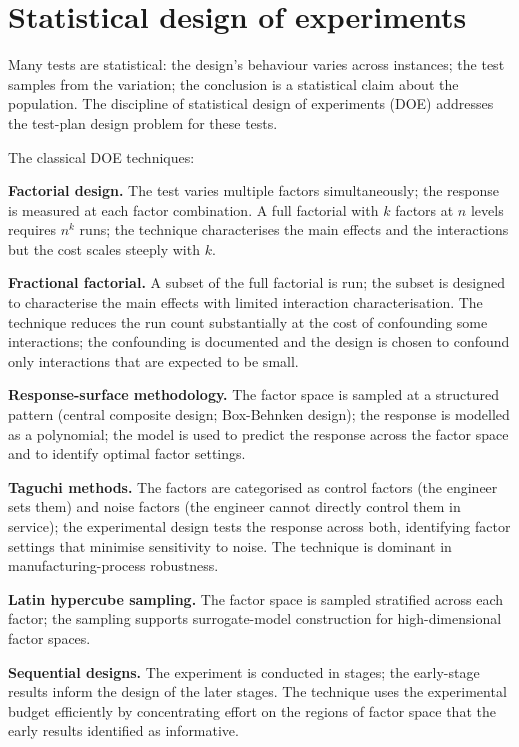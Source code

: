 \section{Statistical design of experiments}

Many tests are statistical: the design's behaviour varies across instances; the test samples from the variation; the conclusion is a statistical claim about the population. The discipline of statistical design of experiments (DOE) addresses the test-plan design problem for these tests.

The classical DOE techniques:

\textbf{Factorial design.} The test varies multiple factors simultaneously; the response is measured at each factor combination. A full factorial with $k$ factors at $n$ levels requires $n^k$ runs; the technique characterises the main effects and the interactions but the cost scales steeply with $k$.

\textbf{Fractional factorial.} A subset of the full factorial is run; the subset is designed to characterise the main effects with limited interaction characterisation. The technique reduces the run count substantially at the cost of confounding some interactions; the confounding is documented and the design is chosen to confound only interactions that are expected to be small.

\textbf{Response-surface methodology.} The factor space is sampled at a structured pattern (central composite design; Box-Behnken design); the response is modelled as a polynomial; the model is used to predict the response across the factor space and to identify optimal factor settings.

\textbf{Taguchi methods.} The factors are categorised as control factors (the engineer sets them) and noise factors (the engineer cannot directly control them in service); the experimental design tests the response across both, identifying factor settings that minimise sensitivity to noise. The technique is dominant in manufacturing-process robustness.

\textbf{Latin hypercube sampling.} The factor space is sampled stratified across each factor; the sampling supports surrogate-model construction for high-dimensional factor spaces.

\textbf{Sequential designs.} The experiment is conducted in stages; the early-stage results inform the design of the later stages. The technique uses the experimental budget efficiently by concentrating effort on the regions of factor space that the early results identified as informative.

